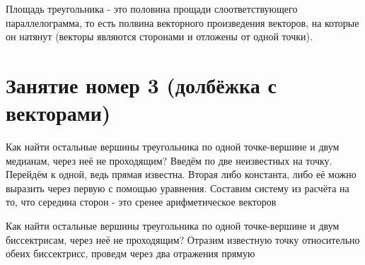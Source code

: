 \documentclass[12pt, a4paper]{article}
\begin{document}
    Площадь треугольника  - это половина прощади слоответствующего параллелограмма, то есть полвина векторного произведения векторов, на которые он натянут 
    (векторы являются сторонами и отложены от одной точки).

    \section{Занятие номер 3 (долбёжка с векторами)}
    
    
    Как найти остальные вершины треугольника по одной точке-вершине и двум медианам, через неё не проходящим? 
    Введём по две неизвестных на точку. Перейдём к одной, ведь прямая известна. Вторая либо константа, либо её можно выразить через первую с помощью уравнения. 
    Составим систему из расчёта на то, что середина сторон - это сренее арифметическое векторов

    Как найти остальные вершины треугольника по одной точке-вершине и двум биссектрисам, через неё не проходящим?
    Отразим известную точку относительно обеих биссектрисс, проведм через два отражения прямую
    
\end{document}
